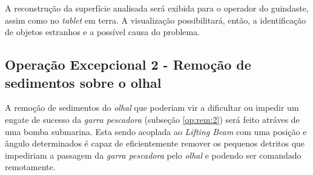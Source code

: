 A reconstrução da superfície analisada será exibida para o operador do
guindaste, assim como no \emph{tablet} em terra. A visualização possibilitará,
então, a identificação de objetos estranhos e a possível causa do problema.

\subsection{Operação Excepcional 2 - Remoção de sedimentos sobre o olhal}

A remoção de sedimentos do \emph{olhal} que poderiam vir a dificultar ou impedir
um engate de sucesso da \emph{garra pescadora} (subseção \ref{op:rem:2}) será
feito atráves de uma bomba submarina. Esta sendo acoplada ao \emph{Lifting
Beam} com uma posição e ângulo determinados é capaz de eficientemente remover os
pequenos detritos que impediriam a passagem da \emph{garra pescadora} pelo
\emph{olhal} e podendo ser comandado remotamente.
